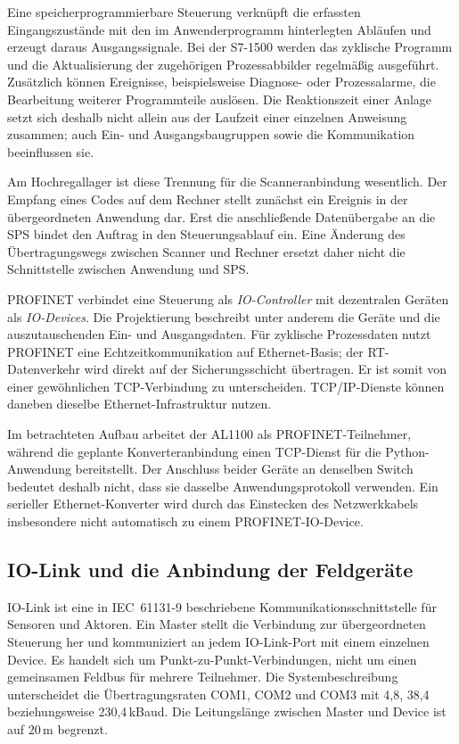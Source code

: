 Eine speicherprogrammierbare Steuerung verknüpft die erfassten Eingangszustände mit den im Anwenderprogramm hinterlegten Abläufen und erzeugt daraus Ausgangssignale. Bei der S7-1500 werden das zyklische Programm und die Aktualisierung der zugehörigen Prozessabbilder regelmäßig ausgeführt. Zusätzlich können Ereignisse, beispielsweise Diagnose- oder Prozessalarme, die Bearbeitung weiterer Programmteile auslösen. Die Reaktionszeit einer Anlage setzt sich deshalb nicht allein aus der Laufzeit einer einzelnen Anweisung zusammen; auch Ein- und Ausgangsbaugruppen sowie die Kommunikation beeinflussen sie. \cite[Kap.~2--3]{siemens_zyklus_2014}

Am Hochregallager ist diese Trennung für die Scanneranbindung wesentlich. Der Empfang eines Codes auf dem Rechner stellt zunächst ein Ereignis in der übergeordneten Anwendung dar. Erst die anschließende Datenübergabe an die SPS bindet den Auftrag in den Steuerungsablauf ein. Eine Änderung des Übertragungswegs zwischen Scanner und Rechner ersetzt daher nicht die Schnittstelle zwischen Anwendung und SPS.

PROFINET verbindet eine Steuerung als \emph{IO-Controller} mit dezentralen Geräten als \emph{IO-Devices}. Die Projektierung beschreibt unter anderem die Geräte und die auszutauschenden Ein- und Ausgangsdaten. Für zyklische Prozessdaten nutzt PROFINET eine Echtzeitkommunikation auf Ethernet-Basis; der RT-Datenverkehr wird direkt auf der Sicherungsschicht übertragen. Er ist somit von einer gewöhnlichen TCP-Verbindung zu unterscheiden. TCP/IP-Dienste können daneben dieselbe Ethernet-Infrastruktur nutzen. \cite[Abschn.~2.1--2.6 und 3.1]{pi_profinet_2018}

Im betrachteten Aufbau arbeitet der AL1100 als PROFINET-Teilnehmer, während die geplante Konverteranbindung einen TCP-Dienst für die Python-Anwendung bereitstellt. Der Anschluss beider Geräte an denselben Switch bedeutet deshalb nicht, dass sie dasselbe Anwendungsprotokoll verwenden. Ein serieller Ethernet-Konverter wird durch das Einstecken des Netzwerkkabels insbesondere nicht automatisch zu einem PROFINET-IO-Device.

\subsection{IO-Link und die Anbindung der Feldgeräte}
\label{sec:grundlagen_iolink}

IO-Link ist eine in IEC~61131-9 beschriebene Kommunikationsschnittstelle für Sensoren und Aktoren. Ein Master stellt die Verbindung zur übergeordneten Steuerung her und kommuniziert an jedem IO-Link-Port mit einem einzelnen Device. Es handelt sich um Punkt-zu-Punkt-Verbindungen, nicht um einen gemeinsamen Feldbus für mehrere Teilnehmer. Die Systembeschreibung unterscheidet die Übertragungsraten COM1, COM2 und COM3 mit 4,8, 38,4 beziehungsweise 230,4\,kBaud. Die Leitungslänge zwischen Master und Device ist auf 20\,m begrenzt. \cite[Abschn.~2.1--2.3]{iolink_system_2018}

